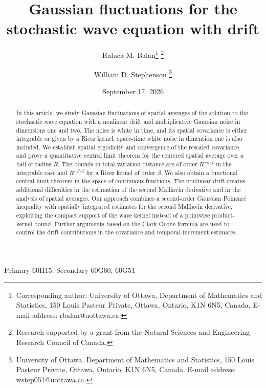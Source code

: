 \documentclass[12pt]{article}
\begin{document}

\title{Gaussian fluctuations for the stochastic wave equation with drift}

\author{Raluca M. Balan\footnote{Corresponding author. University of Ottawa, Department of Mathematics and Statistics, 150 Louis Pasteur Private, Ottawa, Ontario, K1N 6N5, Canada. E-mail address: rbalan@uottawa.ca.} \footnote{Research supported by a grant from the Natural Sciences and Engineering Research Council of Canada.}
\and
William D. Stephenson \footnote{University of Ottawa, Department of Mathematics and Statistics, 150 Louis Pasteur Private, Ottawa, Ontario, K1N 6N5, Canada. E-mail address: wstep051@uottawa.ca.}
}

\date{September 17, 2026}
\maketitle

\begin{abstract}
\noindent In this article, we study Gaussian fluctuations of spatial averages of the solution to the stochastic wave equation with a nonlinear drift and multiplicative Gaussian noise in dimensions one and two. The noise is white in time, and its spatial covariance is either integrable or given by a Riesz kernel; space-time white noise in dimension one is also included. We establish spatial ergodicity and convergence of the rescaled covariance, and prove a quantitative central limit theorem for the centered spatial average over a ball of radius $R$. The bounds in total variation distance are of order $R^{-d/2}$ in the integrable case and $R^{-\beta/2}$ for a Riesz kernel of order $\beta$. We also obtain a functional central limit theorem in the space of continuous functions. The nonlinear drift creates additional difficulties in the estimation of the second Malliavin derivative and in the analysis of spatial averages. Our approach combines a second-order Gaussian Poincar\'e inequality with spatially integrated estimates for the second Malliavin derivative, exploiting the compact support of the wave kernel instead of a pointwise product-kernel bound. Further arguments based on the Clark-Ocone formula are used to control the drift contributions in the covariance and temporal-increment estimates.
\end{abstract}

 Primary 60H15; Secondary 60G60, 60G51
\end{document}
